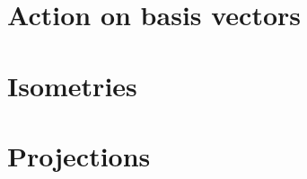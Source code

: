 \documentclass[12pt, oneside]{report}    %
\let\oldsection\section
\def\section{%
  \setcounter{sidenote}{1}%
  \oldsection
}
\begin{document}
\section{Action on basis vectors}

\section{Isometries}
\label{sec:isometries}


\section{Projections}
\label{sec:projections}
\end{document}
